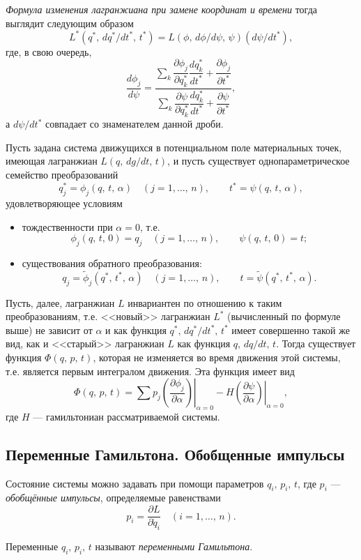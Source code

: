 \documentclass[a4paper,12pt]{article}
\begin{document}
\emph{Формула изменения лагранжиана при замене координат и времени} тогда
выглядит следующим образом
\[
	L^*(q^*,\,dq^* /dt^*,\,t^*)=L(\phi,\,d\phi /d\psi,\,\psi)(d\psi /dt^*)
,\]
где, в свою очередь,
\[
\frac{d\phi_j}{d\psi}=\dfrac{\displaystyle\sum\limits_{k}
	\dfrac{\partial \phi_j}{\partial q_k^*} 
\dfrac{dq^*_k}{dt^*}+\dfrac{\partial \phi_j}{\partial t^*} }{\displaystyle\sum\limits_{k}
\dfrac{\partial \psi}{\partial q_k^*} 
\dfrac{dq^*_k}{dt^*}+\dfrac{\partial \psi}{\partial t^*} }
,\]
а $d \psi /dt^*$ совпадает со знаменателем данной дроби.
\begin{thm}[Нётер]
	Пусть задана система движущихся в потенциальном поле материальных
	точек, имеющая лагранжиан $L(q,\, dg /dt,\, t)$, и пусть существует
	однопараметрическое семейство преобразований
	\[
		q_j^*=\phi_j(q,\,t,\,\alpha) \quad (j=1,\ldots,\, n),
		\qquad t^*=\psi(q,\,t,\,\alpha),
	\]
	удовлетворяющее условиям
	\begin{itemize}
		\item тождественности при $\alpha=0$, т.\:е.
			\[
				\phi_j(q,\,t,\,0)=q_j \quad(j=1,\ldots,\,n),
				\qquad \psi(q,\,t,\,0)=t;
			\]
		\item существования обратного преобразования:
			\[
				q_j= \tilde{\phi}_j(q^*,\,t^*,\,\alpha) \quad
				(j=1,\ldots,\,n), \qquad
				t=\tilde{\psi}(q^*,\,t^*,\,\alpha)
			.\] 
	\end{itemize}
	Пусть, далее, лагранжиан $L$ инвариантен по отношению к таким
	преобразованиям,  т.\:е. <<новый>> лагранжиан  $L^*$ (вычисленный по
	формуле выше) не зависит от $\alpha$ и как функция $q^*,\,dq^* /dt^*,\,
	t^*$ имеет совершенно такой же вид, как и <<старый>> лагранжиан
	$L$ как функция $q,\,dq /dt,\,t$. Тогда существует функция $\Phi(q,\,p,\,t)$,
	которая не изменяется во время движения этой системы, т.\:е.
	является первым интегралом движения. Эта функция имеет вид
	\[
		\Phi(q,\,p,\,t)= \sum p_j \left.\left(\frac{\partial \phi_j}{\partial \alpha}
			\right)\right|_{\alpha=0}-H\left.\left( \frac{\partial
			\psi}{\partial \alpha}  \right) \right|_{\alpha=0}
	,\] 
	где $H$ --- гамильтониан рассматриваемой системы.
\end{thm}
\subsection{Переменные Гамильтона. Обобщенные импульсы}
Состояние системы можно задавать при помощи параметров $q_i,\,p_i,\,t$, где
 $p_i$ --- \emph{обобщённые импульсы}, определяемые равенствами
 \[
	 p_i=\frac{\partial L}{\partial \dot{q}_i} \quad (i=1,\ldots,\,n)
 .\] 
\begin{dfn}
	Переменные $q_i,\,p_i,\,t$ называют \emph{переменными Гамильтона}.
\end{dfn}
\end{document}
